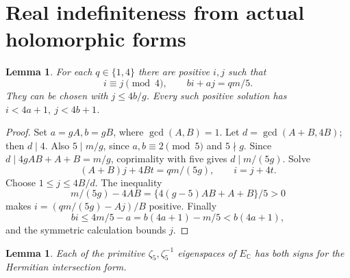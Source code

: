 \documentclass[11pt]{article}
\newtheorem{lemma}[theorem]{Lemma}
\newcommand{\C}{\mathbb C}
\begin{document}
\section{Real indefiniteness from actual holomorphic forms}

\begin{lemma}\label{lem:indices}
For each \(q\in\{1,4\}\) there are positive \(i,j\) such that
\[
 i\equiv j\pmod4,\qquad bi+aj=qm/5.                            \tag{18}
\]
They can be chosen with \(j\le4b/g\). Every such positive solution
has \(i<4a+1,\ j<4b+1\).
\end{lemma}

\begin{proof}
Set \(a=gA,b=gB\), where \(\gcd(A,B)=1\).
Let \(d=\gcd(A+B,4B)\); then \(d\mid4\).
Also \(5\mid m/g\), since \(a,b\equiv2\pmod5\) and \(5\nmid g\).
Since \(d\mid 4gAB+A+B=m/g\), coprimality with five gives
\(d\mid m/(5g)\).
Solve
\[
 (A+B)j+4Bt=qm/(5g),\qquad i=j+4t.
 \]
Choose \(1\le j\le4B/d\). The inequality
\[
 m/(5g)-4AB=\{4(g-5)AB+A+B\}/5>0
 \]
makes \(i=(qm/(5g)-Aj)/B\) positive. Finally
\[
 bi\le4m/5-a=b(4a+1)-m/5<b(4a+1),
 \]
and the symmetric calculation bounds \(j\).
\end{proof}

\begin{lemma}\label{lem:forms}
Each of the primitive \(\zeta_5,\zeta_5^{-1}\) eigenspaces of
\(E_\C\) has both signs for the Hermitian intersection form.
\end{lemma}
\end{document}
